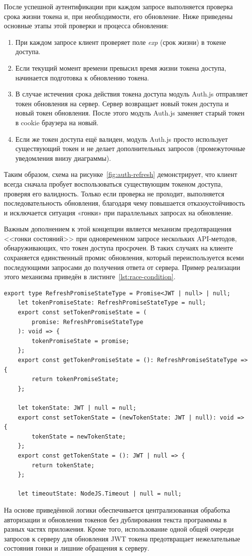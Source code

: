 После успешной аутентификации при каждом запросе выполняется проверка срока жизни токена и, при необходимости, его обновление.  Ниже приведены основные этапы этой проверки и процесса обновления:
\begin{enumerate}
    \item При каждом запросе клиент проверяет поле \textit{exp} (срок жизни) в токене доступа.
    \item Если текущий момент времени превысил время жизни токена доступа, начинается подготовка к обновлению токена.
    \item В случае истечения срока действия токена доступа модуль Auth.js отправляет токен обновления на сервер. Сервер возвращает новый токен доступа и новый токен обновления. После этого модуль Auth.js заменяет старый токен в cookie браузера на новый.
    \item Если же токен доступа ещё валиден, модуль Auth.js просто использует существующий токен и не делает дополнительных запросов (промежуточные уведомления внизу диаграммы).
\end{enumerate}

Таким образом, схема на рисунке~\ref{fig:auth-refresh} демонстрирует, что клиент всегда сначала пробует воспользоваться существующим токеном доступа, проверяя его валидность. Только если проверка не проходит, выполняется последовательность обновления, благодаря чему повышается отказоустойчивость и исключается ситуация «гонки» при параллельных запросах на обновление.

Важным дополнением к этой концепции является механизм предотвращения <<гонки состояний>> при одновременном запросе нескольких API-методов, обнаруживающих, что токен доступа просрочен. В таких случаях на клиенте сохраняется единственный промис обновления, который переиспользуется всеми последующими запросами до получения ответа от сервера. Пример реализации этого механизма приведён в листинге~\ref{lst:race-condition}.

\begin{lstlisting}[caption={Механизм предотвращения race condition при рефреше токена}, label={lst:race-condition}]
	export type RefreshPromiseStateType = Promise<JWT | null> | null;
	let tokenPromiseState: RefreshPromiseStateType = null;
	export const setTokenPromiseState = (
		promise: RefreshPromiseStateType
	): void => {
		tokenPromiseState = promise;
	};
	export const getTokenPromiseState = (): RefreshPromiseStateType => {
		return tokenPromiseState;
	};

	let tokenState: JWT | null = null;
	export const setTokenState = (newTokenState: JWT | null): void => {
		tokenState = newTokenState;
	};
	export const getTokenState = (): JWT | null => {
		return tokenState;
	};

	let timeoutState: NodeJS.Timeout | null = null;
\end{lstlisting}

На основе приведённой логики обеспечивается централизованная обработка авторизации и обновления токенов без дублирования текста программмы в разных частях приложения. Кроме того, использование одной общей очереди запросов к серверу для обновления JWT токена предотвращает нежелательные состояния гонки и лишние обращения к серверу.
